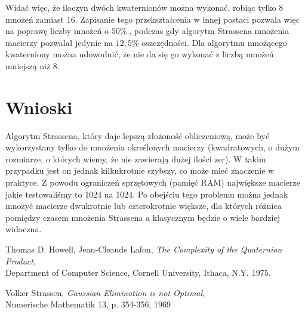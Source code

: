 \documentclass[paper=a4, fontsize=11pt]{scrartcl} %
\numberwithin{equation}{section} %
\numberwithin{figure}{section} %
\numberwithin{table}{section} %
\begin{document}
Widać więc, że iloczyn dwóch kwaternionów można wykonać, robiąc tylko 8 mnożeń zamiast 16\cite{quaternion}. 
Zapisanie tego przekształcenia w innej postaci pozwala więc na poprawę liczby mnożeń o ${50\%}$., 
podczas gdy algorytm Strassena mnożenia macierzy pozwalał jedynie na ${12,5\%}$ oszczędności.\medbreak
Dla algorytmu mnożącego kwaterniony można udowodnić, że nie da się go wykonać z liczbą mnożeń mniejszą niż 8.\cite{quaternion}

\section{Wnioski}
Algorytm Strassena, który daje lepszą złożoność obliczeniową, może być wykorzystany
tylko do mnożenia określonych macierzy 
(kwadratowych, o dużym rozmiarze, o których wiemy, że nie zawierają dużej ilości zer).
W takim przypadku jest on jednak kilkukrotnie szybszy, co może mieć znaczenie w praktyce.
Z powodu ograniczeń sprzętowych (pamięć RAM) największe macierze jakie testowaliśmy
to 1024 na 1024.
Po obejściu tego problemu można jednak mnożyć macierze dwukrotnie lub czterokrotnie większe, 
dla których różnica pomiędzy czasem mnożenia Strassena a klasycznym będzie o wiele bardziej widoczna.

\begin{thebibliography}{9}

  Thomas D. Howell,
  Jean-Cleaude Lafon,
  \textit{The Complexity of the Quaternion Product}, \\
  Department of Computer Science, Cornell University, Ithaca, N.Y.
  1975.

  Volker Strassen,
  \textit{Gaussian Elimination is not Optimal}, \\
  Numerische Mathematik 13, p. 354-356, 1969
\end{thebibliography}
\end{document}
